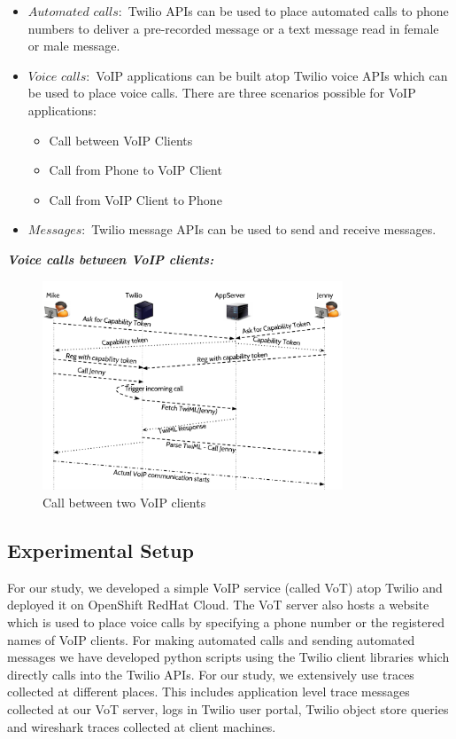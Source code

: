 \begin{itemize}
\item $Automated$ $calls: $ Twilio APIs can be used to place automated calls to phone numbers to deliver a pre-recorded message or a text message read in female or male message.
\item $Voice$ $calls: $ VoIP applications can be built atop Twilio voice APIs which can be used to place voice calls. There are three scenarios possible for VoIP applications:  
\begin{itemize}
\item Call between VoIP Clients
\item Call from Phone to VoIP Client
\item Call from VoIP Client to Phone
\end{itemize}
\item $Messages: $ Twilio message APIs can be used to send and receive messages.
\end{itemize}
\emph{\textbf{Voice calls between VoIP clients:} }
\begin{figure}[t!] 
\centering
  \includegraphics[width=0.8\textwidth]{figs/twoclients.pdf}
\caption{Call between two VoIP clients}
\label{fig:2VoIPcall}
\end{figure}
\subsection{Experimental Setup}

For our study, we developed a simple VoIP service (called VoT) atop Twilio and deployed it on OpenShift RedHat Cloud. The VoT server also hosts a website which is used to place voice calls by specifying a phone number or the registered names of VoIP clients. For making automated calls and sending automated messages we have developed python scripts using the Twilio client libraries which directly calls into the Twilio APIs. For our study, we extensively use traces collected at different places. This includes application level trace messages collected at our VoT server, logs in Twilio user portal, Twilio object store queries and wireshark traces collected at client machines.

